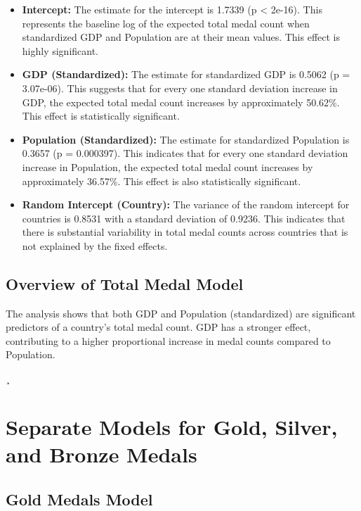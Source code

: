 \documentclass[a4paper,12pt]{article}
\begin{document}
\begin{itemize}
	\item \textbf{Intercept:} The estimate for the intercept is 1.7339 (p < 2e-16). This represents the baseline log of the expected total medal count when standardized GDP and Population are at their mean values. This effect is highly significant.
	\item \textbf{GDP (Standardized):} The estimate for standardized GDP is 0.5062 (p = 3.07e-06). This suggests that for every one standard deviation increase in GDP, the expected total medal count increases by approximately 50.62\%. This effect is statistically significant.
	\item \textbf{Population (Standardized):} The estimate for standardized Population is 0.3657 (p = 0.000397). This indicates that for every one standard deviation increase in Population, the expected total medal count increases by approximately 36.57\%. This effect is also statistically significant.
	\item \textbf{Random Intercept (Country):} The variance of the random intercept for countries is 0.8531 with a standard deviation of 0.9236. This indicates that there is substantial variability in total medal counts across countries that is not explained by the fixed effects.
\end{itemize}



\subsection{Overview of Total Medal Model }

The analysis shows that both GDP and Population (standardized) are significant predictors of a country's total medal count. GDP has a stronger effect, contributing to a higher proportional increase in medal counts compared to Population.
















\clearpage¸
\section{Separate Models for Gold, Silver, and Bronze Medals}

\subsection{Gold Medals Model}
\end{document}
